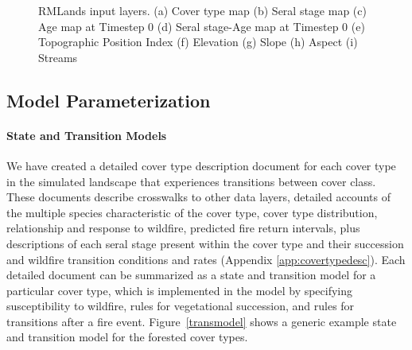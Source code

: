 \begin{figure}[!htbp]
  \centering
   \qquad
	 \qquad
   \qquad
	 \qquad

  \caption{RMLands input layers. (a) Cover type map (b) Seral stage map (c) Age map at Timestep 0 (d) Seral stage-Age map at Timestep 0 (e) Topographic Position Index (f) Elevation (g) Slope (h) Aspect (i) Streams}
  \label{fig:inputlayermaps}
\end{figure}


\subsection{Model Parameterization}
\label{subsec:hrvmodelparam}

\paragraph{State and Transition Models}
We have created a detailed cover type description document for each cover type in the simulated landscape that experiences transitions between cover class. These documents describe crosswalks to other data layers, detailed accounts of the multiple species characteristic of the cover type, cover type distribution, relationship and response to wildfire, predicted fire return intervals, plus descriptions of each seral stage present within the cover type and their succession and wildfire transition conditions and rates (Appendix \ref{app:covertypedesc}). Each detailed document can be summarized as a state and transition model for a particular cover type, which is implemented in the model by specifying susceptibility to wildfire, rules for vegetational succession, and rules for transitions after a fire event. Figure~\ref{transmodel} shows a generic example state and transition model for the forested cover types.

